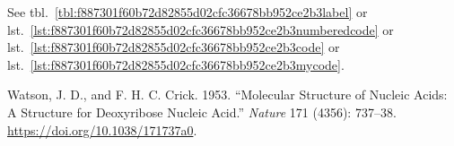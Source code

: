 See tbl.~\ref{tbl:f887301f60b72d82855d02cfc36678bb952ce2b3label} or
lst.~\ref{lst:f887301f60b72d82855d02cfc36678bb952ce2b3numberedcode} or
lst.~\ref{lst:f887301f60b72d82855d02cfc36678bb952ce2b3code} or
lst.~\ref{lst:f887301f60b72d82855d02cfc36678bb952ce2b3mycode}.

\hypertarget{9210402039f6de27e109aad91536dbb424f40b80refs}{}
\begin{CSLReferences}{1}{0}
\leavevmode{}%
Watson, J. D., and F. H. C. Crick. 1953. {``Molecular Structure of
Nucleic Acids: A Structure for Deoxyribose Nucleic Acid.''}
\emph{Nature} 171 (4356): 737--38.
\url{https://doi.org/10.1038/171737a0}.

\end{CSLReferences}
